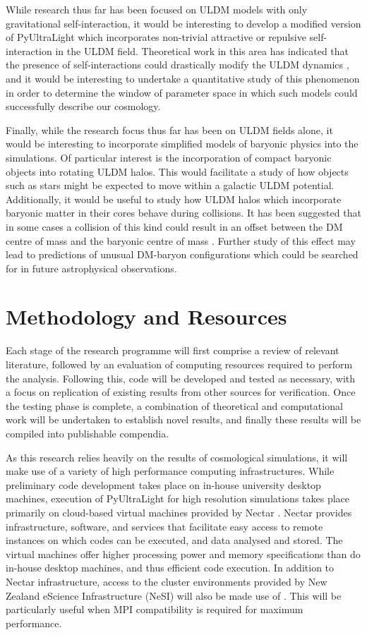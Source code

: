While research thus far has been focused on ULDM models with only gravitational self-interaction, it would be interesting to develop a modified version of PyUltraLight which incorporates non-trivial attractive or repulsive self-interaction in the ULDM field. Theoretical work in this area has indicated that the presence of self-interactions could drastically modify the ULDM dynamics \cite{Suarez:2011yf}, and it would be interesting to undertake a quantitative study of this phenomenon in order to determine the window of parameter space in which such models could successfully describe our cosmology.

Finally, while the research focus thus far has been on ULDM fields alone, it would be interesting to incorporate simplified models of baryonic physics into the simulations. Of particular interest is the incorporation of compact baryonic objects into rotating ULDM halos. This would facilitate a study of how objects such as stars might be expected to move within a galactic ULDM potential. Additionally, it would be useful to study how ULDM halos which incorporate baryonic matter in their cores behave during collisions. It has been suggested that in some cases a collision of this kind could result in an offset between the DM centre of mass and the baryonic centre of mass \cite{Paredes:2015wga}. Further study of this effect may lead to predictions of unusual DM-baryon configurations which could be searched for in future astrophysical observations.



\section{Methodology and Resources}

Each stage of the research programme will first comprise a review of relevant literature, followed by an evaluation of computing resources required to perform the analysis. Following this, code will be developed and tested as necessary, with a focus on replication of existing results from other sources for verification. Once the testing phase is complete, a combination of theoretical and computational work will be undertaken to establish novel results, and finally these results will be compiled into publishable compendia.

As this research relies heavily on the results of cosmological simulations, it will make use of a variety of high performance computing infrastructures. While preliminary code development takes place on in-house university desktop machines, execution of PyUltraLight for high resolution simulations takes place primarily on cloud-based virtual machines provided by Nectar \cite{nectar}. Nectar provides infrastructure, software, and services that facilitate easy access to remote instances on which codes can be executed, and data analysed and stored. The virtual machines offer higher processing power and memory specifications than do in-house desktop machines, and thus efficient code execution. 
In addition to Nectar infrastructure, access to the cluster environments provided by New Zealand eScience Infrastructure (NeSI) will also be made use of \cite{nesi}. This will be particularly useful when MPI compatibility is required for maximum performance.


